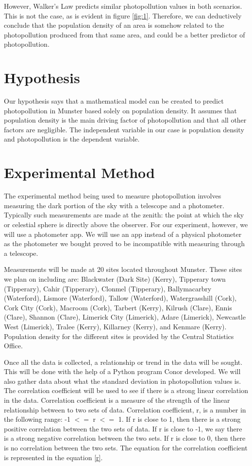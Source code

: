 However, Walker's Law predicts similar photopollution values in both scenarios. This is not the case, as is evident in figure \ref{fig:1}. Therefore, we can deductively conclude that the population density of an area is somehow related to the photopollution produced from that same area, and could be a better predictor of photopollution. 


\section{Hypothesis}
Our hypothesis says that a mathematical model can be created to predict photopollution in Munster based solely on population density. It assumes that population density is the main driving factor of photopollution and that all other factors are negligible. The independent variable in our case is population density and photopollution is the dependent variable.

\section{Experimental Method}
The experimental method being used to measure photopollution involves measuring the dark portion of the sky with a telescope and a photometer. Typically such measurements are made at the zenith: the point at which the sky or celestial sphere is directly above the observer.\cite{calculatelux}\cite{zenith} 
For our experiment, however, we will use a photometer app. We will use an app instead of a physical photometer as the photometer we bought proved to be incompatible with measuring through a telescope.

Measurements will be made at 20 sites located throughout Munster. These sites we plan on including are: Blackwater (Dark Site) (Kerry), Tipperary town (Tipperary), Cahir (Tipperary), Clonmel (Tipperary), Ballymacarbry (Waterford), Lismore (Waterford), Tallow (Waterford), Watergrasshill (Cork), Cork City (Cork), Macroom (Cork), Tarbert (Kerry), Kilrush (Clare), Ennis (Clare), Shannon (Clare), Limerick City (Limerick), Adare (Limerick), Newcastle West (Limerick), Tralee (Kerry), Killarney (Kerry), and Kenmare (Kerry). Population density for the different sites is provided by the Central Statistics Office.\cite{2016CensusTowns}\cite{2016ElectoralDiv}

Once all the data is collected, a relationship or trend in the data will be sought. This will be done with the help of a Python program Conor developed. We will also gather data about what the standard deviation in photopollution values is. The correlation coefficient will be used to see if there is a strong linear correlation in the data. Correlation coefficient is a measure of the strength of the linear relationship between to two sets of data. Correlation coefficient, r,  is a number in the following range: -1 $<=$ r $<=$ 1. If r is close to 1, then there is a strong positive correlation between the two sets of data. If r is close to -1, we say there is a strong negative correlation between the two sets. If r is close to 0, then there is no correlation between the two sets.\cite{am4}
The equation for the correlation coefficient is represented in the equation \ref{r}.\cite{r}

